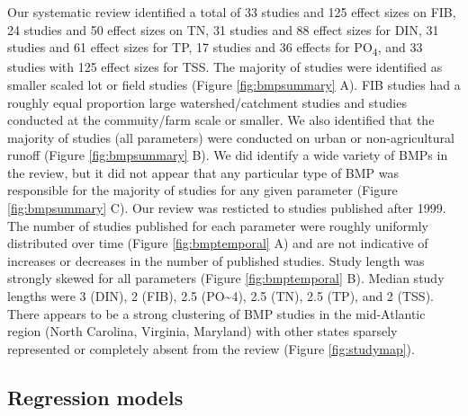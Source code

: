 \documentclass[utf8]{FrontiersinHarvard}
\begin{document}
Our systematic review identified a total of 33 studies and 125 effect sizes on FIB, 24 studies and 50 effect sizes on TN, 31 studies and 88 effect sizes for DIN, 31 studies and 61 effect sizes for TP, 17 studies and 36 effects for PO\textsubscript{4}, and 33 studies with 125 effect sizes for TSS.
The majority of studies were identified as smaller scaled lot or field studies (Figure \ref{fig:bmpsummary} A).
FIB studies had a roughly equal proportion large watershed/catchment studies and studies conducted at the commuity/farm scale or smaller.
We also identified that the majority of studies (all parameters) were conducted on urban or non-agricultural runoff (Figure \ref{fig:bmpsummary} B).
We did identify a wide variety of BMPs in the review, but it did not appear that any particular type of BMP was responsible for the majority of studies for any given parameter (Figure \ref{fig:bmpsummary} C).
Our review was resticted to studies published after 1999.
The number of studies published for each parameter were roughly uniformly distributed over time (Figure \ref{fig:bmptemporal} A) and are not indicative of increases or decreases in the number of published studies.
Study length was strongly skewed for all parameters (Figure \ref{fig:bmptemporal} B). Median study lengths were 3 (DIN), 2 (FIB), 2.5 (PO\textasciitilde4), 2.5 (TN), 2.5 (TP), and 2 (TSS).
There appears to be a strong clustering of BMP studies in the mid-Atlantic region (North Carolina, Virginia, Maryland) with other states sparsely represented or completely absent from the review (Figure \ref{fig:studymap}).

\hypertarget{regression-models}{%
\subsection{Regression models}\label{regression-models}}
\end{document}
